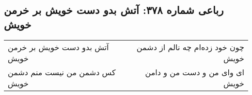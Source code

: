 \begin{center}
\section*{رباعی شماره ۳۷۸: آتش بدو دست خویش بر خرمن خویش}
\label{sec:sh378}
\begin{longtable}{l p{0.5cm} r}
آتش بدو دست خویش بر خرمن خویش
&&
چون خود زده‌ام چه نالم از دشمن خویش
\\
کس دشمن من نیست منم دشمن خویش
&&
ای وای من و دست من و دامن خویش
\\
\end{longtable}
\end{center}
